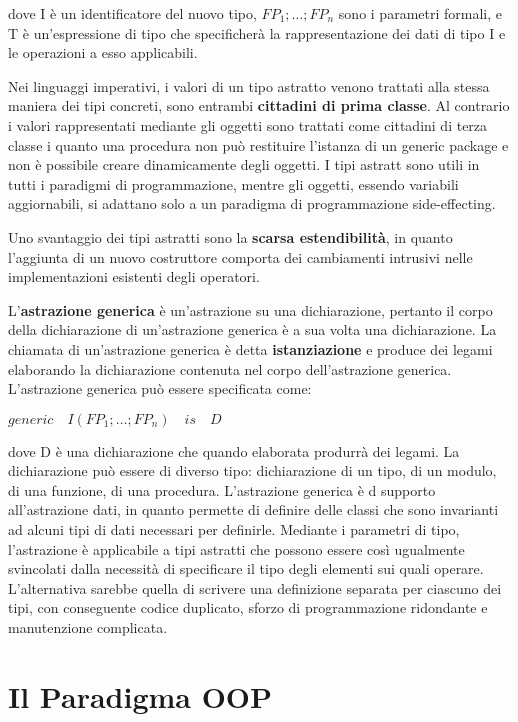 \documentclass[a4paper,18pt]{extarticle}
\begin{document}
dove I è un identificatore del nuovo tipo, $FP_1;\dots;FP_n$ sono i parametri formali, e T è un'espressione di tipo che specificherà la rappresentazione dei dati di tipo I e le operazioni a esso applicabili.

Nei linguaggi imperativi, i valori di un tipo astratto venono trattati alla stessa maniera dei tipi concreti, sono entrambi \textbf{cittadini di prima classe}. Al contrario i valori rappresentati mediante gli oggetti sono trattati come cittadini di terza classe i quanto una procedura non può restituire l'istanza di un generic package e non è possibile creare dinamicamente degli oggetti. I tipi astratt sono utili in tutti i paradigmi di programmazione, mentre gli oggetti, essendo variabili aggiornabili, si adattano solo a un paradigma di programmazione side-effecting.

Uno svantaggio dei tipi astratti sono la \textbf{scarsa estendibilità}, in quanto l'aggiunta di un nuovo costruttore comporta dei cambiamenti intrusivi nelle implementazioni esistenti degli operatori.

L'\textbf{astrazione generica} è un'astrazione su una dichiarazione, pertanto il corpo della dichiarazione di un'astrazione generica è a sua volta una dichiarazione. La chiamata di un'astrazione generica è detta \textbf{istanziazione} e produce dei legami elaborando la dichiarazione contenuta nel corpo dell'astrazione generica. L'astrazione generica può essere specificata come:

\begin{center}
    $generic \quad I(FP_1;\dots;FP_n) \quad is\quad D$
\end{center}

dove D è una dichiarazione che quando elaborata produrrà dei legami. La dichiarazione può essere di diverso tipo: dichiarazione di un tipo, di un modulo, di una funzione, di una procedura. L'astrazione generica è d supporto all'astrazione dati, in quanto permette di definire delle classi che sono invarianti ad alcuni tipi di dati necessari per definirle. Mediante i parametri di tipo, l'astrazione è applicabile a tipi astratti che possono essere così ugualmente svincolati dalla necessità di specificare il tipo degli elementi sui quali operare. L'alternativa sarebbe quella di scrivere una definizione separata per ciascuno dei tipi, con conseguente codice duplicato, sforzo di programmazione ridondante e manutenzione complicata.

\newpage

\section{ Il Paradigma OOP}
\end{document}
